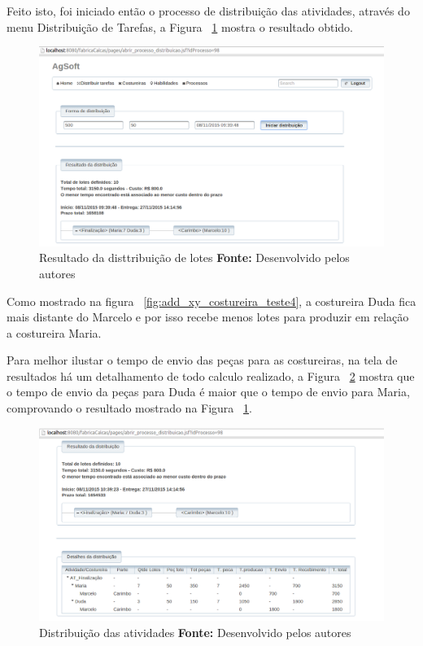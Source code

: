 \newpage

\par Feito isto, foi iniciado então o processo de distribuição das atividades,
através do menu Distribuição de Tarefas, a Figura
~\ref{fig:resultado_transporte_teste4} mostra o resultado obtido.


\begin{figure}[h!]
	\centerline{\includegraphics[scale=0.3]{./imagens/resultado_transporte_teste4.png}}
	\caption[Resultado da disttribuição de lotes]
	{Resultado da disttribuição de lotes \textbf{Fonte:} Desenvolvido pelos autores}
	\label{fig:resultado_transporte_teste4}
\end{figure}

\par Como mostrado na figura ~\ref{fig:add_xy_costureira_teste4}, a costureira
Duda fica mais distante do Marcelo e por isso recebe menos lotes para produzir em
relação a costureira Maria.

\par Para melhor ilustar o tempo de envio das peças para as costureiras, na tela
de resultados há um detalhamento de todo calculo realizado, a Figura
~\ref{fig:detalhameneto_transporte_teste4} mostra que o tempo de envio da peças para Duda é 
maior que o tempo de envio para Maria, comprovando o resultado mostrado na
Figura ~\ref{fig:resultado_transporte_teste4}.

\begin{figure}[h!]
	\centerline{\includegraphics[scale=0.3]{./imagens/detalhamento_transporte_teste4.png}}
	\caption[Distribuição das atividades] 
	{Distribuição das atividades \textbf{Fonte:} Desenvolvido pelos autores}
	\label{fig:detalhameneto_transporte_teste4}
\end{figure}

